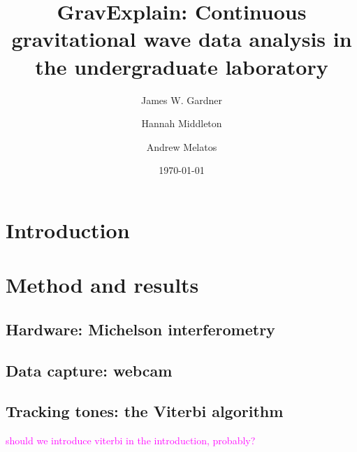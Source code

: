 \documentclass[prb,preprint]{revtex4-1}
\newcommand{\jam}{\textcolor{magenta}}
\begin{document}
\title{GravExplain: Continuous gravitational wave data analysis in the undergraduate laboratory}

\author{James W. Gardner}

\author{Hannah Middleton}
\author{Andrew Melatos}

\date{\today}

\begin{abstract}

	
\end{abstract}

\maketitle

\section{Introduction}


\section{Method and results}

\subsection{Hardware: Michelson interferometry}

\subsection{Data capture: webcam}


\subsection{Tracking tones: the Viterbi algorithm}
\jam{should we introduce viterbi in the introduction, probably?}
\end{document}
